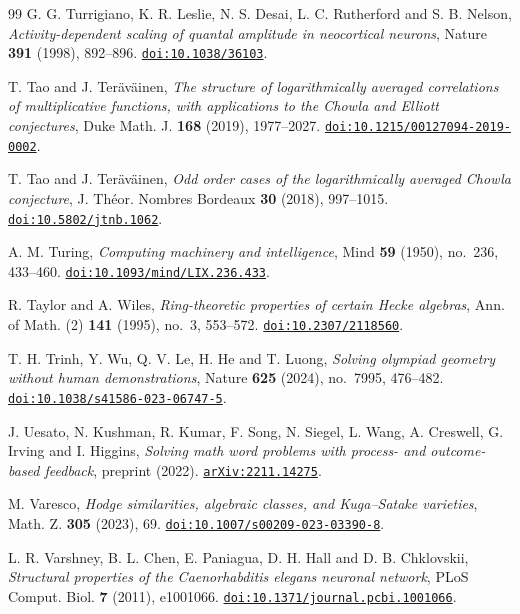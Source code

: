 \begin{thebibliography}{99}
G. G. Turrigiano, K. R. Leslie, N. S. Desai, L. C. Rutherford and S. B. Nelson,
\emph{Activity-dependent scaling of quantal amplitude in neocortical neurons},
Nature \textbf{391} (1998), 892--896.
\href{https://doi.org/10.1038/36103}{\nolinkurl{doi:10.1038/36103}}.

T. Tao and J. Ter\"av\"ainen,
\emph{The structure of logarithmically averaged correlations of multiplicative functions, with applications to the Chowla and Elliott conjectures},
Duke Math. J. \textbf{168} (2019), 1977--2027.
\href{https://doi.org/10.1215/00127094-2019-0002}{\nolinkurl{doi:10.1215/00127094-2019-0002}}.

T. Tao and J. Ter\"av\"ainen,
\emph{Odd order cases of the logarithmically averaged Chowla conjecture},
J. Th\'eor. Nombres Bordeaux \textbf{30} (2018), 997--1015.
\href{https://doi.org/10.5802/jtnb.1062}{\nolinkurl{doi:10.5802/jtnb.1062}}.

A. M. Turing,
\emph{Computing machinery and intelligence},
Mind \textbf{59} (1950), no.~236, 433--460.
\href{https://doi.org/10.1093/mind/LIX.236.433}{\nolinkurl{doi:10.1093/mind/LIX.236.433}}.

R. Taylor and A. Wiles,
\emph{Ring-theoretic properties of certain Hecke algebras},
Ann. of Math. (2) \textbf{141} (1995), no.~3, 553--572.
\href{https://doi.org/10.2307/2118560}{\nolinkurl{doi:10.2307/2118560}}.

T. H. Trinh, Y. Wu, Q. V. Le, H. He and T. Luong,
\emph{Solving olympiad geometry without human demonstrations},
Nature \textbf{625} (2024), no.~7995, 476--482.
\href{https://doi.org/10.1038/s41586-023-06747-5}{\nolinkurl{doi:10.1038/s41586-023-06747-5}}.

J. Uesato, N. Kushman, R. Kumar, F. Song, N. Siegel, L. Wang, A. Creswell, G. Irving and I. Higgins,
\emph{Solving math word problems with process- and outcome-based feedback},
preprint (2022).
\href{https://arxiv.org/abs/2211.14275}{\nolinkurl{arXiv:2211.14275}}.

M. Varesco,
\emph{Hodge similarities, algebraic classes, and Kuga--Satake varieties},
Math. Z. \textbf{305} (2023), 69.
\href{https://doi.org/10.1007/s00209-023-03390-8}{\nolinkurl{doi:10.1007/s00209-023-03390-8}}.

L. R. Varshney, B. L. Chen, E. Paniagua, D. H. Hall and D. B. Chklovskii,
\emph{Structural properties of the Caenorhabditis elegans neuronal network},
PLoS Comput. Biol. \textbf{7} (2011), e1001066.
\href{https://doi.org/10.1371/journal.pcbi.1001066}{\nolinkurl{doi:10.1371/journal.pcbi.1001066}}.


\end{thebibliography}
